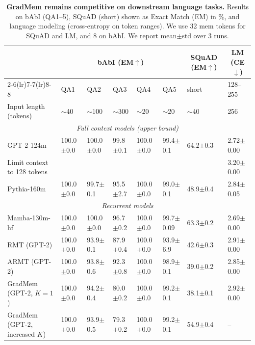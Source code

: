 \documentclass{article}
\theoremstyle{plain}
\theoremstyle{definition}
\theoremstyle{remark}
\begin{document}
{\begin{table}[t]
\caption{\textbf{GradMem remains competitive on downstream language tasks.} Results on bAbI (QA1--5), SQuAD (short) shown as Exact Match (EM) in \%, and language modeling (cross-entropy on token ranges). We use 32 mem tokens for SQuAD and LM, and 8 on bAbI. We report mean$\pm$std over 3 runs.}
\label{tab:nlp_results}
\centering
\small
\setlength{\tabcolsep}{3pt}
\begin{tabular}{llllll l l}
\toprule
 & \multicolumn{5}{c}{bAbI (EM$\uparrow$)} & \multicolumn{1}{c}{SQuAD (EM$\uparrow$)} & \multicolumn{1}{c}{LM (CE$\downarrow$)} \\
\cmidrule(lr){2-6}\cmidrule(lr){7-7}\cmidrule(lr){8-8}
 & QA1 & QA2 & QA3 & QA4 & QA5 & short & 128--255 \\
\midrule
Input length (tokens) & $\sim$40 & $\sim$100 & $\sim$300 & $\sim$20 & $\sim$20 & $\sim$40 & 256 \\
\midrule
\multicolumn{8}{c}{\textit{Full context models (upper bound)}}\\
GPT-2-124m & 100.0{\tiny$\pm$0.0} & 100.0{\tiny$\pm$0.0} & 99.8{\tiny$\pm$0.1} & 100.0{\tiny$\pm$0.0} & 99.4{\tiny$\pm$0.1} & 64.2{\tiny$\pm$0.3} & 2.72{\tiny$\pm$0.00} \\
\smallskip
\quad Limit context to 128 tokens &  &  &  &  &  &  & 3.20{\tiny$\pm$0.00} \\
Pythia-160m & 100.0{\tiny$\pm$0.0} & 99.7{\tiny$\pm$0.1} & 95.5{\tiny$\pm$2.7} & 100.0{\tiny$\pm$0.0} & 99.0{\tiny$\pm$0.1} & 48.9{\tiny$\pm$0.4} & 2.84{\tiny$\pm$0.05} \\
\midrule 
\multicolumn{8}{c}{\textit{Recurrent models}}\\
Mamba-130m-hf & 100.0{\tiny$\pm$0.0} & 100.0{\tiny$\pm$0.0} & 96.7{\tiny$\pm$0.2} & 100.0{\tiny$\pm$0.0} & 99.7{\tiny$\pm$0.09} & 63.3{\tiny$\pm$0.2} & 2.69{\tiny$\pm$0.00} \\
RMT (GPT-2) & 100.0{\tiny$\pm$0.0} & 93.9{\tiny$\pm$0.1} & 87.9{\tiny$\pm$0.4} & 100.0{\tiny$\pm$0.0} & 93.9{\tiny$\pm$6.9} & 42.6{\tiny$\pm$0.3} & 2.91{\tiny$\pm$0.00} \\
ARMT (GPT-2) & 100.0{\tiny$\pm$0.0} & 93.8{\tiny$\pm$0.6} & 92.3{\tiny$\pm$0.8} & 100.0{\tiny$\pm$0.0} & 98.9{\tiny$\pm$0.1} & 39.0{\tiny$\pm$0.2} & 2.85{\tiny$\pm$0.00} \\
\midrule
GradMem (GPT-2, $K=1$) & 100.0{\tiny$\pm$0.0} & 94.2{\tiny$\pm$0.4} & 80.0{\tiny$\pm$0.2} & 100.0{\tiny$\pm$0.0} & 99.2{\tiny$\pm$0.1} & 38.1{\tiny$\pm$0.1} & 2.92{\tiny$\pm$0.00} \\
GradMem (GPT-2, increased $K$) & 100.0{\tiny$\pm$0.0} & 93.9{\tiny$\pm$0.5} & 79.3{\tiny$\pm$0.2} & 100.0{\tiny$\pm$0.0} & 99.2{\tiny$\pm$0.1} & 54.9{\tiny$\pm$0.4} & -- \\
\bottomrule
\end{tabular}


\end{table}}
\end{document}
